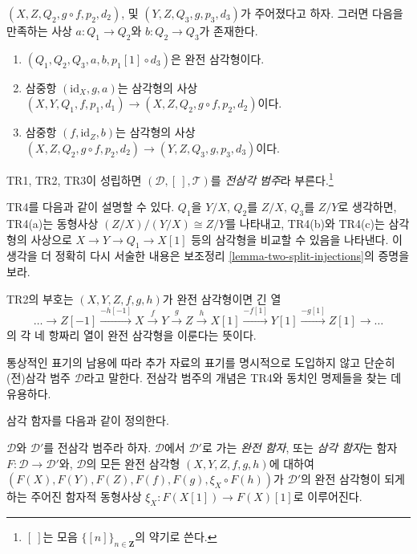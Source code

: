 \begin{definition}
\begin{enumerate}
$(X, Z, Q_2, g \circ f, p_2, d_2)$,
및
$(Y, Z, Q_3, g, p_3, d_3)$가 주어졌다고 하자.
그러면 다음을 만족하는 사상 $a : Q_1 \to Q_2$와 $b : Q_2 \to Q_3$가
존재한다.
\begin{enumerate}
\item $(Q_1, Q_2, Q_3, a, b, p_1[1] \circ d_3)$은 완전 삼각형이다.
\item 삼중항 $(\text{id}_X, g, a)$는 삼각형의 사상
$(X, Y, Q_1, f, p_1, d_1) \to (X, Z, Q_2, g \circ f, p_2, d_2)$이다.
\item 삼중항 $(f, \text{id}_Z, b)$는 삼각형의 사상
$(X, Z, Q_2, g \circ f, p_2, d_2) \to (Y, Z, Q_3, g, p_3, d_3)$이다.
\end{enumerate}
\end{enumerate}
TR1, TR2, TR3이 성립하면 $(\mathcal{D}, [\ ], \mathcal{T})$를
{\it 전삼각 범주}라 부른다.\footnote{$[\ ]$는 모음
$\{[n]\}_{n\in \mathbf{Z}}$의 약기로 쓴다.}
\end{definition}

\noindent
TR4를 다음과 같이 설명할 수 있다. $Q_1$을 $Y/X$, $Q_2$를 $Z/X$,
$Q_3$를 $Z/Y$로 생각하면, TR4(a)는 동형사상
$(Z/X)/(Y/X) \cong Z/Y$를 나타내고, TR4(b)와 TR4(c)는 삼각형의 사상으로
$X \to Y \to Q_1 \to X[1]$ 등의 삼각형을 비교할 수 있음을 나타낸다.
이 생각을 더 정확히 다시 서술한 내용은 보조정리
\ref{lemma-two-split-injections}의 증명을 보라.

\medskip\noindent
TR2의 부호는 $(X, Y, Z, f, g, h)$가 완전 삼각형이면 긴 열
\begin{equation}
\label{equation-rotate}
\ldots \to
Z[-1] \xrightarrow{-h[-1]}
X \xrightarrow{f}
Y \xrightarrow{g}
Z \xrightarrow{h}
X[1] \xrightarrow{-f[1]}
Y[1] \xrightarrow{-g[1]}
Z[1] \to \ldots
\end{equation}
의 각 네 항짜리 열이 완전 삼각형을 이룬다는 뜻이다.

\medskip\noindent
통상적인 표기의 남용에 따라 추가 자료의 표기를 명시적으로 도입하지 않고
단순히 (전)삼각 범주 $\mathcal{D}$라고 말한다. 전삼각 범주의 개념은
TR4와 동치인 명제들을 찾는 데 유용하다.

\medskip\noindent
삼각 함자를 다음과 같이 정의한다.

\begin{definition}
\label{definition-exact-functor-triangulated-categories}
$\mathcal{D}$와 $\mathcal{D}'$를 전삼각 범주라 하자.
$\mathcal{D}$에서 $\mathcal{D}'$로 가는 {\it 완전 함자}, 또는
{\it 삼각 함자}는 함자 $F : \mathcal{D} \to \mathcal{D}'$와,
$\mathcal{D}$의 모든 완전 삼각형 $(X, Y, Z, f, g, h)$에 대하여
$(F(X), F(Y), F(Z), F(f), F(g), \xi_X \circ F(h))$가
$\mathcal{D}'$의 완전 삼각형이 되게 하는 주어진 함자적 동형사상
$\xi_X : F(X[1]) \to F(X)[1]$로 이루어진다.
\end{definition}

